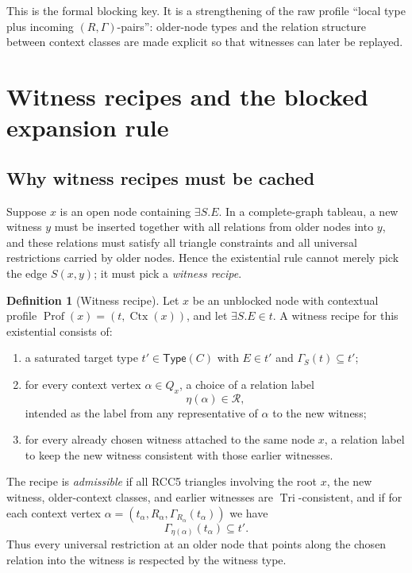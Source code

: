 \documentclass[11pt]{article}
\theoremstyle{definition}
\newtheorem{definition}[theorem]{Definition}
\newcommand{\Roles}{\mathcal{R}}
\newcommand{\Prof}{\operatorname{Prof}}
\newcommand{\Ctx}{\operatorname{Ctx}}
\newcommand{\Tri}{\operatorname{Tri}}
\begin{document}
This is the formal blocking key. It is a strengthening of the raw profile ``local type plus incoming $(R,\Gamma)$-pairs'': older-node types and the relation structure between context classes are made explicit so that witnesses can later be replayed.

\section{Witness recipes and the blocked expansion rule}

\subsection{Why witness recipes must be cached}

Suppose $x$ is an open node containing $\exists S.E$. In a complete-graph tableau, a new witness $y$ must be inserted together with all relations from older nodes into $y$, and these relations must satisfy all triangle constraints and all universal restrictions carried by older nodes. Hence the existential rule cannot merely pick the edge $S(x,y)$; it must pick a \emph{witness recipe}.

\begin{definition}[Witness recipe]
Let $x$ be an unblocked node with contextual profile $\Prof(x)=(t,\Ctx(x))$, and let $\exists S.E\in t$. A witness recipe for this existential consists of:
\begin{enumerate}[label=(\alph*)]
  \item a saturated target type $t'\in \mathsf{Type}(C)$ with $E\in t'$ and $\Gamma_S(t)\subseteq t'$;
  \item for every context vertex $\alpha\in Q_x$, a choice of a relation label
  \[
  \eta(\alpha)\in\Roles,
  \]
  intended as the label from any representative of $\alpha$ to the new witness;
  \item for every already chosen witness attached to the same node $x$, a relation label to keep the new witness consistent with those earlier witnesses.
\end{enumerate}
The recipe is \emph{admissible} if all RCC5 triangles involving the root $x$, the new witness, older-context classes, and earlier witnesses are $\Tri$-consistent, and if for each context vertex $\alpha=(t_\alpha,R_\alpha,\Gamma_{R_\alpha}(t_\alpha))$ we have
\[
\Gamma_{\eta(\alpha)}(t_\alpha)\subseteq t'.
\]
Thus every universal restriction at an older node that points along the chosen relation into the witness is respected by the witness type.
\end{definition}
\end{document}
